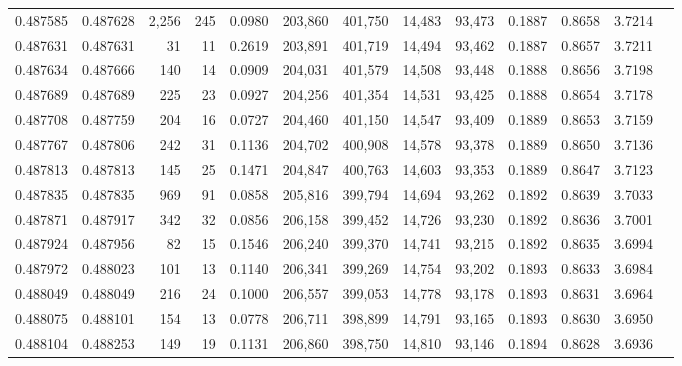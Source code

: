 \begin{tabular}{rrrrrrrrrrrrr}
0.487585 & 0.487628 & 2,256 &   245 &                                     0.0980 & 203,860 & 401,750 &  14,483 &  93,473 & 0.1887 & 0.8658 & 3.7214 \\
0.487631 & 0.487631 &    31 &    11 &                                     0.2619 & 203,891 & 401,719 &  14,494 &  93,462 & 0.1887 & 0.8657 & 3.7211 \\
0.487634 & 0.487666 &   140 &    14 &                                     0.0909 & 204,031 & 401,579 &  14,508 &  93,448 & 0.1888 & 0.8656 & 3.7198 \\
0.487689 & 0.487689 &   225 &    23 &                                     0.0927 & 204,256 & 401,354 &  14,531 &  93,425 & 0.1888 & 0.8654 & 3.7178 \\
0.487708 & 0.487759 &   204 &    16 &                                     0.0727 & 204,460 & 401,150 &  14,547 &  93,409 & 0.1889 & 0.8653 & 3.7159 \\
0.487767 & 0.487806 &   242 &    31 &                                     0.1136 & 204,702 & 400,908 &  14,578 &  93,378 & 0.1889 & 0.8650 & 3.7136 \\
0.487813 & 0.487813 &   145 &    25 &                                     0.1471 & 204,847 & 400,763 &  14,603 &  93,353 & 0.1889 & 0.8647 & 3.7123 \\
0.487835 & 0.487835 &   969 &    91 &                                     0.0858 & 205,816 & 399,794 &  14,694 &  93,262 & 0.1892 & 0.8639 & 3.7033 \\
0.487871 & 0.487917 &   342 &    32 &                                     0.0856 & 206,158 & 399,452 &  14,726 &  93,230 & 0.1892 & 0.8636 & 3.7001 \\
0.487924 & 0.487956 &    82 &    15 &                                     0.1546 & 206,240 & 399,370 &  14,741 &  93,215 & 0.1892 & 0.8635 & 3.6994 \\
0.487972 & 0.488023 &   101 &    13 &                                     0.1140 & 206,341 & 399,269 &  14,754 &  93,202 & 0.1893 & 0.8633 & 3.6984 \\
0.488049 & 0.488049 &   216 &    24 &                                     0.1000 & 206,557 & 399,053 &  14,778 &  93,178 & 0.1893 & 0.8631 & 3.6964 \\
0.488075 & 0.488101 &   154 &    13 &                                     0.0778 & 206,711 & 398,899 &  14,791 &  93,165 & 0.1893 & 0.8630 & 3.6950 \\
0.488104 & 0.488253 &   149 &    19 &                                     0.1131 & 206,860 & 398,750 &  14,810 &  93,146 & 0.1894 & 0.8628 & 3.6936 \\

\end{tabular}
